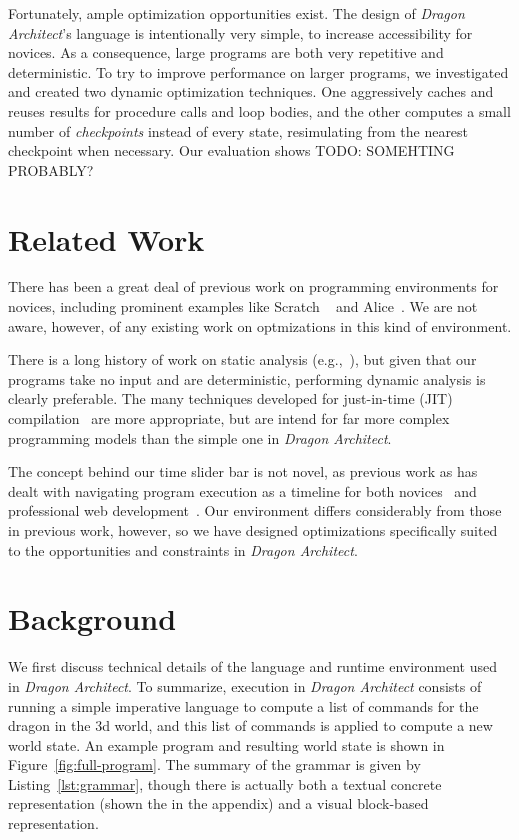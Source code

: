 \documentclass{sig-alternate}
\newcommand{\da}{\emph{Dragon Architect}}
\newcommand{\todo}[1]{{\color{red} TODO: #1}}
\begin{document}
Fortunately, ample optimization opportunities exist. The design of \da{}'s language is intentionally very simple, to increase accessibility for novices. As a consequence, large programs are both very repetitive and deterministic. To try to improve performance on larger programs, we investigated and created two dynamic optimization techniques. One aggressively caches and reuses results for procedure calls and loop bodies, and the other computes a small number of \emph{checkpoints} instead of every state, resimulating from the nearest checkpoint when necessary. Our evaluation shows \todo{SOMEHTING PROBABLY?}

\section{Related Work}
There has been a great deal of previous work on programming environments for novices, including prominent examples like Scratch ~\cite{resnick2009scratch} and Alice~\cite{cooper2000alice}. We are not aware, however, of any existing work on optmizations in this kind of environment. 

There is a long history of work on static analysis (e.g.,~\cite{cousot1977abstract}), but given that our programs take no input and are deterministic, performing dynamic analysis is clearly preferable. The many techniques developed for just-in-time (JIT) compilation~\cite{aycock2003brief} are more appropriate, but are intend for far more complex programming models than the simple one in \da.

The concept behind our time slider bar is not novel, as previous work as has dealt with navigating program execution as a timeline for both novices~\cite{ko2004designing} and professional web development~\cite{burg2013interactive}. Our environment differs considerably from those in previous work, however, so we have designed optimizations specifically suited to the opportunities and constraints in \da.

\section{Background}

We first discuss technical details of the language and runtime environment used in \da. To summarize, execution in \da{} consists of running a simple imperative language to compute a list of commands for the dragon in the 3d world, and this list of commands is applied to compute a new world state. An example program and resulting world state is shown in Figure~\ref{fig:full-program}. The summary of the grammar is given by Listing~\ref{lst:grammar}, though there is actually both a textual concrete representation (shown the in the appendix) and a visual block-based representation.
\end{document}
